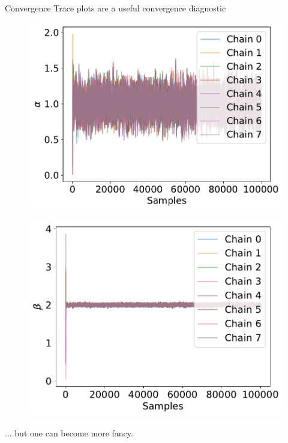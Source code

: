 \documentclass[
aspectratio=169,
14pt,
professionalfonts
]{beamer}
\begin{document}
\begin{frame}{Convergence}
    Trace plots are a useful convergence diagnostic
    \begin{minipage}[t]{0.49\linewidth}
    \begin{figure}
        \centering
        \includegraphics[width=\linewidth]{../plots/trace_theta0.pdf}
    \end{figure}
    \end{minipage}
    \begin{minipage}[t]{0.49\linewidth}
    \begin{figure}
        \centering
        \includegraphics[width=\linewidth]{../plots/trace_theta1.pdf}
    \end{figure}
    \end{minipage}
    ... but one can become more fancy. %
\end{frame}
\end{document}

